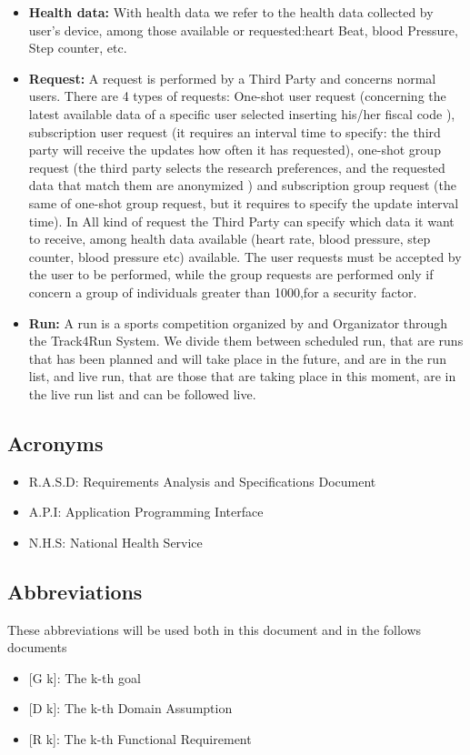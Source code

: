 \begin{itemize}
\item\textbf{Health data:} With health data we refer to the health data collected by user's device, among those available or requested:heart Beat, blood Pressure, Step counter, etc. 
\item\textbf{Request:} A request is performed by a Third Party and concerns normal users. There are 4 types of requests: One-shot user request (concerning the latest available data of a specific user selected inserting his/her fiscal code ), subscription user request (it requires an interval time to specify: the third party will receive the updates how often it has requested), one-shot group request (the third party selects the research preferences, and the requested data that match them are anonymized ) and subscription group request (the same of one-shot group request, but it requires to specify the update interval time). In All kind of request the Third Party can specify which data it want to receive, among health data available (heart rate, blood pressure, step counter, blood pressure etc) available. The user requests must be accepted by the user to be performed, while the group requests are performed only if concern a group of individuals greater than 1000,for a security factor.
\item\textbf{Run:} A run is a sports competition organized by and Organizator through  the Track4Run System. We divide them between scheduled run, that are runs that has been planned and will take place in the future, and are in the run list, and live run, that are those that are taking place in this moment, are in the live run list and can be followed live. 



	
	\end{itemize}
\subsection{Acronyms}

\begin{itemize}
  \item R.A.S.D: Requirements Analysis and Specifications Document
  \item A.P.I: Application Programming Interface 
  \item N.H.S: National Health Service
\end{itemize}

\subsection{Abbreviations}
These abbreviations will be used both in this document and in the follows documents
\begin{itemize}
	\item {[}G k{]}: The k-th goal
    \item {[}D k{]}: The k-th Domain Assumption
    \item {[}R k{]}: The k-th Functional Requirement
\end{itemize}
